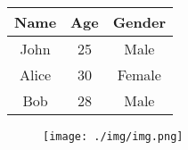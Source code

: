 \documentclass{article}
\begin{document}
\begin{table}[h!]
\centering
\begin{tabular}{|c|c|c|}
\hline
Name & Age & Gender \\
\hline
John & 25 & Male \\
\hline
Alice & 30 & Female \\
\hline
Bob & 28 & Male \\
\hline
\end{tabular}
\end{table}

\begin{figure}[h!]
\centering
\texttt{[image: ./img/img.png]}
\end{figure}
\end{document}
